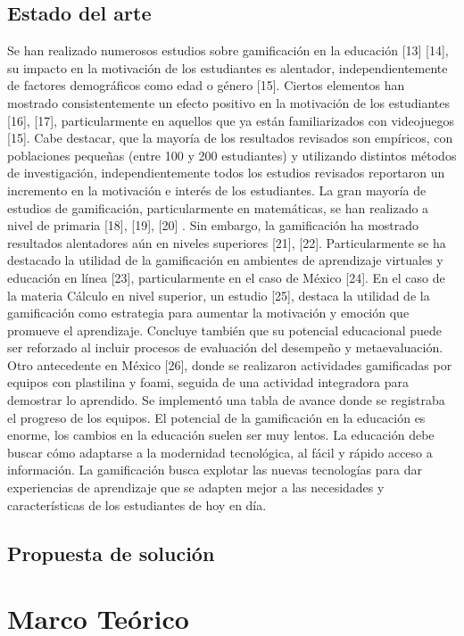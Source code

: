 \documentclass{article}
\begin{document}
\subsection{Estado del arte}
Se han realizado numerosos estudios sobre gamificación en la educación [13] [14], su impacto en la motivación de los estudiantes es alentador, independientemente de factores demográficos como edad o género [15]. 
Ciertos elementos han  mostrado consistentemente un efecto positivo en la motivación de los estudiantes [16], [17], particularmente en aquellos que ya están familiarizados con videojuegos [15]. Cabe destacar, que la mayoría de los resultados revisados son empíricos, con poblaciones pequeñas (entre 100 y 200 estudiantes) y utilizando distintos métodos de investigación, independientemente todos los estudios revisados reportaron un incremento en la motivación e interés de los estudiantes.
La gran mayoría de estudios de gamificación, particularmente en matemáticas, se han realizado a nivel de primaria [18], [19], [20] . Sin embargo, la gamificación ha mostrado resultados alentadores aún en niveles superiores [21], [22]. Particularmente se ha destacado la utilidad de la gamificación en ambientes de aprendizaje virtuales y educación en línea [23], particularmente en el caso de México [24].
En el caso de la materia Cálculo en nivel superior, un estudio [25], destaca la utilidad de la gamificación como estrategia para aumentar la motivación y emoción que promueve el aprendizaje. Concluye también que su potencial educacional puede ser reforzado al incluir procesos de evaluación del desempeño y metaevaluación. 
Otro antecedente en México [26], donde se realizaron actividades gamificadas por equipos con plastilina y foami, seguida de una actividad integradora para demostrar lo aprendido. Se implementó una tabla de avance donde se registraba el progreso de los equipos.
El potencial de la gamificación en la educación es enorme, los cambios en la educación suelen ser muy lentos. La educación debe buscar cómo adaptarse a la modernidad tecnológica, al fácil y rápido acceso a información. La gamificación busca explotar las nuevas tecnologías para dar experiencias de aprendizaje que se adapten mejor a las necesidades y características de los estudiantes de hoy en día. 
\subsection{Propuesta de solución }
\section{Marco Teórico}
\end{document}
